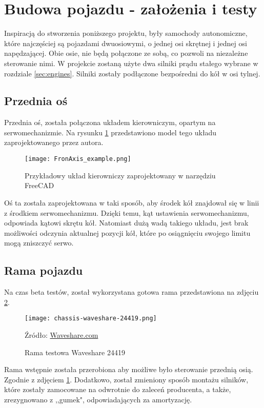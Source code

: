 \section{Budowa pojazdu - założenia i testy}
    Inspiracją do stworzenia poniższego projektu, były samochody autonomiczne, które najczęściej są pojazdami dwuosiowymi, o jednej osi skrętnej i jednej osi napędzającej.
    Obie osie, nie będą połączone ze sobą, co pozwoli na niezależne sterowanie nimi.
    W projekcie zostaną użyte dwa silniki prądu stałego wybrane w rozdziale \ref{sec:engines}.
    Silniki zostały podłączone bezpośredni do kół w osi tylnej.
    \subsection{Przednia oś}
        Przednia oś, została połączona układem kierowniczym, opartym na serwomechanizmie.
        Na rysunku \ref{fig:frontAxis_model} przedstawiono model tego układu zaprojektowanego przez autora.

        \begin{figure}[!ht]
            \centering
            \texttt{[image: FronAxis\_example.png]}
            \caption{Przykładowy układ kierowniczy zaprojektowany w narzędziu FreeCAD}
            \label{fig:frontAxis_model}
        \end{figure}
        Oś ta została zaprojektowana w taki sposób, aby środek kół znajdował się w linii z środkiem serwomechanizmu.
        Dzięki temu, kąt ustawienia serwomechanizmu, odpowiada kątowi skrętu kół.
        Natomiast dużą wadą takiego układu, jest brak możliwości odczynia aktualnej pozycji kół, które po osiągnięciu swojego limitu mogą zniszczyć serwo.

    \subsection{Rama pojazdu}
    Na czas beta testów, został wykorzystana gotowa rama przedstawiona na zdjęciu \ref{fig:test_chassis}.
    \begin{figure}[!ht]
        \centering
        \texttt{[image: chassis-waveshare-24419.png]}
        \caption{Rama testowa Waveshare 24419}
        Źródło: \href{https://www.waveshare.com/robot-chassis.htm?sku=24419}{Waveshare.com}
        \label{fig:test_chassis}
    \end{figure}

    Rama wstępnie została przerobiona aby możliwe było sterowanie przednią osią. Zgodnie z zdjęciem \ref{fig:frontAxis_model}.
    Dodatkowo, został zmieniony sposób montażu silników, które zostały zamocowane na odwrotnie do zaleceń producenta, a także, zrezygnowano z ,,gumek", odpowiadających za amortyzację.


